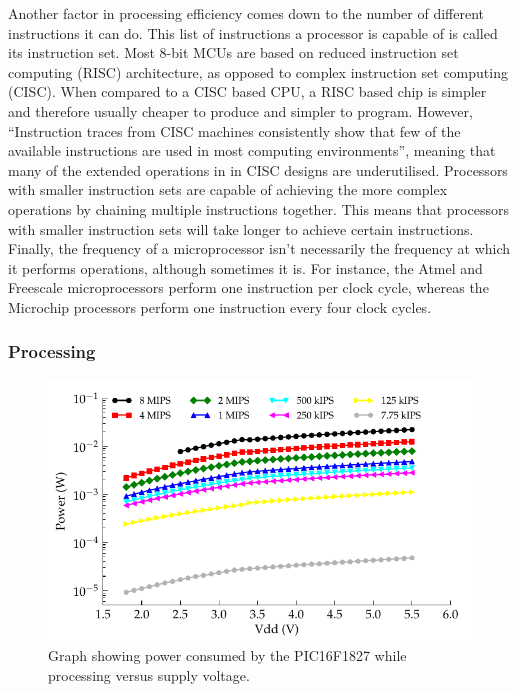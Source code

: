       Another factor in processing efficiency comes down to the number of different instructions it can do.
      This list of instructions a processor is capable of is called its instruction set.
      Most 8-bit MCUs are based on reduced instruction set computing (RISC) architecture, as opposed to complex instruction set computing (CISC).
      When compared to a CISC based CPU, a RISC based chip is simpler and therefore usually cheaper to produce and simpler to program.
      However, ``Instruction traces from CISC machines consistently show that few of the available instructions are used in most computing environments''\cite{ComputerArch}, meaning that many of the extended operations in in CISC designs are underutilised.
      Processors with smaller instruction sets are capable of achieving the more complex operations by chaining multiple instructions together.
      This means that processors with smaller instruction sets will take longer to achieve certain instructions.
      Finally, the frequency of a microprocessor isn't necessarily the frequency at which it performs operations, although sometimes it is.
      For instance, the Atmel and Freescale microprocessors perform one instruction per clock cycle, whereas the Microchip processors perform one instruction every four clock cycles.


    \subsubsection{Processing}

      \begin{figure}
        \centering
        \includegraphics{content/pt1/03-EnergyRequirements/graphics/Graph_PIC16F1827_Clock_Power}
        \caption{\label{graph:CLK_POWER_16F1827}Graph showing power consumed by the PIC16F1827 while processing versus supply voltage.}
      \end{figure}

